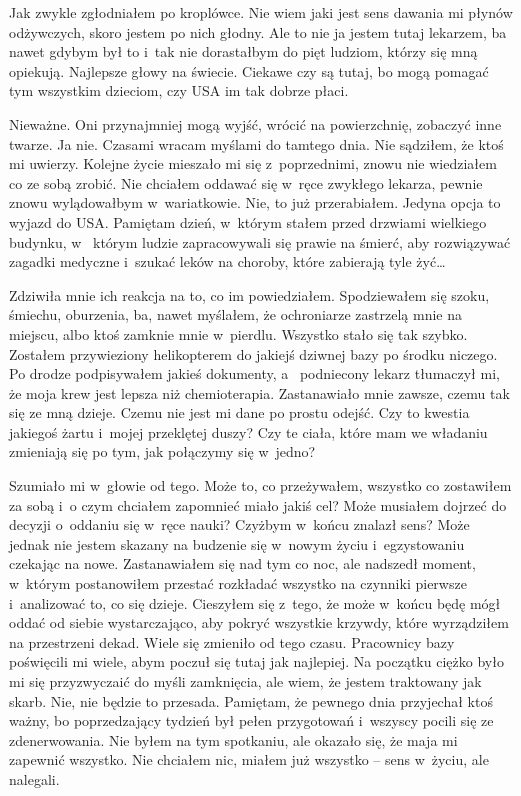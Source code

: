 Jak zwykle zgłodniałem po kroplówce. Nie wiem jaki jest sens dawania mi płynów odżywczych, skoro jestem po nich 
głodny. Ale to nie ja jestem tutaj lekarzem, ba nawet gdybym był to i~tak nie dorastałbym do pięt ludziom, którzy się 
mną opiekują. Najlepsze głowy na świecie. Ciekawe czy są tutaj, bo mogą pomagać tym wszystkim dzieciom, czy USA im 
tak dobrze płaci. 

Nieważne. Oni przynajmniej mogą wyjść, wrócić na powierzchnię, zobaczyć inne twarze. Ja nie. Czasami wracam myślami 
do tamtego dnia. Nie sądziłem, że ktoś mi uwierzy. Kolejne życie mieszało mi się z~poprzednimi, znowu nie wiedziałem 
co ze sobą zrobić. Nie chciałem oddawać się w~ręce zwykłego lekarza, pewnie znowu wylądowałbym w~wariatkowie. Nie, to 
już przerabiałem. Jedyna opcja to wyjazd do USA. Pamiętam dzień, w~którym stałem przed drzwiami wielkiego budynku, w~
którym ludzie zapracowywali się prawie na śmierć, aby rozwiązywać zagadki medyczne i~szukać leków na choroby, które 
zabierają tyle żyć…

Zdziwiła mnie ich reakcja na to, co im powiedziałem. Spodziewałem się szoku, śmiechu, oburzenia, ba, nawet myślałem, 
że ochroniarze zastrzelą mnie na miejscu, albo ktoś zamknie mnie w~pierdlu. Wszystko stało się tak szybko. Zostałem 
przywieziony helikopterem do jakiejś dziwnej bazy po środku niczego. Po drodze podpisywałem jakieś dokumenty, a~
podniecony lekarz tłumaczył mi, że moja krew jest lepsza niż chemioterapia. Zastanawiało mnie zawsze, czemu tak się 
ze mną dzieje. Czemu nie jest mi dane po prostu odejść. Czy to kwestia jakiegoś żartu i~mojej przeklętej duszy? Czy 
te ciała, które mam we władaniu zmieniają się po tym, jak połączymy się w~jedno? 

Szumiało mi w~głowie od tego. Może to, co przeżywałem, wszystko co zostawiłem za sobą i~o czym chciałem zapomnieć 
miało jakiś cel? Może musiałem dojrzeć do decyzji o~oddaniu się w~ręce nauki? Czyżbym w~końcu znalazł sens? Może 
jednak nie jestem skazany na budzenie się w~nowym życiu i~egzystowaniu czekając na nowe. Zastanawiałem się nad tym co 
noc, ale nadszedł moment, w~którym postanowiłem przestać rozkładać wszystko na czynniki pierwsze i~analizować to, co 
się dzieje. Cieszyłem się z~tego, że może w~końcu będę mógł oddać od siebie wystarczająco, aby pokryć wszystkie 
krzywdy, które wyrządziłem na przestrzeni dekad. Wiele się zmieniło od tego czasu. Pracownicy bazy poświęcili mi 
wiele, abym poczuł się tutaj jak najlepiej. Na początku ciężko było mi się przyzwyczaić do myśli zamknięcia, ale 
wiem, że jestem traktowany jak skarb. Nie, nie będzie to przesada. Pamiętam, że pewnego dnia przyjechał ktoś ważny, 
bo poprzedzający tydzień był pełen przygotowań i~wszyscy pocili się ze zdenerwowania. Nie byłem na tym spotkaniu, ale 
okazało się, że maja mi zapewnić wszystko. Nie chciałem nic, miałem już wszystko -- sens w~życiu, ale nalegali.

